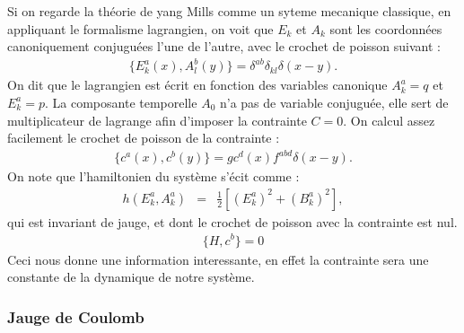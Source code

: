 \documentclass[a4paper,11pt]{article}
\theoremstyle{plain}
\theoremstyle{definition}
\theoremstyle{remark}
\numberwithin{equation}{section}
\numberwithin{equation}{subsection}
\numberwithin{figure}{section}
\begin{document}
Si on regarde la théorie de yang Mills comme un syteme mecanique classique, en appliquant le formalisme lagrangien, 
on voit que $E_{k}$ et $A_{k}$ sont les coordonnées canoniquement conjuguées l'une de l'autre, avec le crochet de poisson suivant :
\begin{eqnarray}
  \{ E_{k}^{a}(x) , A_{l}^{b}(y) \} = \delta^{ab} \delta_{kl} \delta(x-y).
\end{eqnarray}
On dit que le lagrangien est écrit en fonction des variables canonique $A_{k}^{a}=q$ et $E_{k}^{a}=p$. 
La composante temporelle $A_{0}$ n'a pas de variable conjuguée, elle sert de multiplicateur de lagrange afin d'imposer la contrainte $C=0$. 
On calcul assez facilement le crochet de poisson de la contrainte :
\begin{eqnarray}
 \{ c^{a}(x) , c^{b}(y) \} = g c^{d}(x) f^{abd} \delta(x-y).
\end{eqnarray}
On note que l'hamiltonien du système s'écit comme :
\begin{eqnarray}
 h(E_{k}^{a},A_{k}^{a}) &=& \frac{1}{2}\left[(E_{k}^{a})^{2} + (B_{k}^{a})^2 \right],
\end{eqnarray}
qui est invariant de jauge, et dont le crochet de poisson avec la contrainte est nul.
\begin{eqnarray}
 \{ H , c^{b} \} = 0 
\end{eqnarray}
Ceci nous donne une information interessante, en effet la contrainte sera une constante de la dynamique de notre système.

\subsubsection{Jauge de Coulomb}
\end{document}
